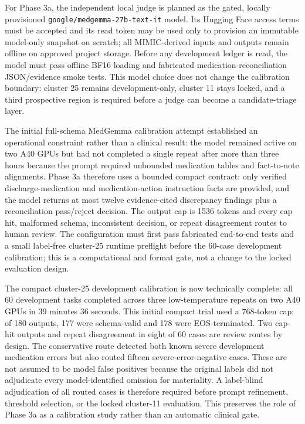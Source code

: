\documentclass[11pt]{article}
\begin{document}
For Phase 3a, the independent local judge is planned as the gated, locally provisioned \texttt{google/medgemma-27b-text-it} model. Its Hugging Face access terms must be accepted and its read token may be used only to provision an immutable model-only snapshot on scratch; all MIMIC-derived inputs and outputs remain offline on approved project storage. Before any development ledger is read, the model must pass offline BF16 loading and fabricated medication-reconciliation JSON/evidence smoke tests. This model choice does not change the calibration boundary: cluster 25 remains development-only, cluster 11 stays locked, and a third prospective region is required before a judge can become a candidate-triage layer.

The initial full-schema MedGemma calibration attempt established an operational constraint rather than a clinical result: the model remained active on two A40 GPUs but had not completed a single repeat after more than three hours because the prompt required unbounded medication tables and fact-to-note alignments. Phase 3a therefore uses a bounded compact contract: only verified discharge-medication and medication-action instruction facts are provided, and the model returns at most twelve evidence-cited discrepancy findings plus a reconciliation pass/reject decision. The output cap is 1536 tokens and every cap hit, malformed schema, inconsistent decision, or repeat disagreement routes to human review. The configuration must first pass fabricated end-to-end tests and a small label-free cluster-25 runtime preflight before the 60-case development calibration; this is a computational and format gate, not a change to the locked evaluation design.

The compact cluster-25 development calibration is now technically complete: all 60 development tasks completed across three low-temperature repeats on two A40 GPUs in 39 minutes 36 seconds. This initial compact trial used a 768-token cap; of 180 outputs, 177 were schema-valid and 178 were EOS-terminated. Two cap-hit outputs and repeat disagreement in eight of 60 cases are review routes by design. The conservative route detected both known severe development medication errors but also routed fifteen severe-error-negative cases. These are not assumed to be model false positives because the original labels did not adjudicate every model-identified omission for materiality. A label-blind adjudication of all routed cases is therefore required before prompt refinement, threshold selection, or the locked cluster-11 evaluation. This preserves the role of Phase 3a as a calibration study rather than an automatic clinical gate.
\end{document}
